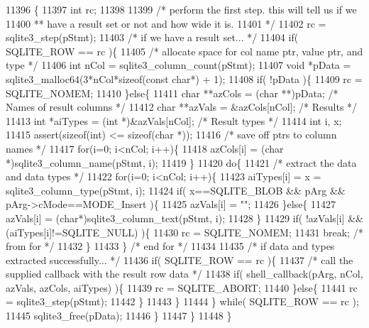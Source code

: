 \begin{DoxyCode}
11396  \{
11397   \textcolor{keywordtype}{int} rc;
11398 
11399   \textcolor{comment}{/* perform the first step.  this will tell us if we}
11400 \textcolor{comment}{  ** have a result set or not and how wide it is.}
11401 \textcolor{comment}{  */}
11402   rc = sqlite3_step(pStmt);
11403   \textcolor{comment}{/* if we have a result set... */}
11404   \textcolor{keywordflow}{if}( SQLITE_ROW == rc )\{
11405     \textcolor{comment}{/* allocate space for col name ptr, value ptr, and type */}
11406     \textcolor{keywordtype}{int} nCol = sqlite3_column_count(pStmt);
11407     \textcolor{keywordtype}{void} *pData = sqlite3_malloc64(3*nCol*\textcolor{keyword}{sizeof}(\textcolor{keyword}{const} \textcolor{keywordtype}{char}*) + 1);
11408     \textcolor{keywordflow}{if}( !pData )\{
11409       rc = SQLITE_NOMEM;
11410     \}\textcolor{keywordflow}{else}\{
11411       \textcolor{keywordtype}{char} **azCols = (\textcolor{keywordtype}{char} **)pData;      \textcolor{comment}{/* Names of result columns */}
11412       \textcolor{keywordtype}{char} **azVals = &azCols[nCol];       \textcolor{comment}{/* Results */}
11413       \textcolor{keywordtype}{int} *aiTypes = (\textcolor{keywordtype}{int} *)&azVals[nCol]; \textcolor{comment}{/* Result types */}
11414       \textcolor{keywordtype}{int} i, x;
11415       assert(\textcolor{keyword}{sizeof}(\textcolor{keywordtype}{int}) <= \textcolor{keyword}{sizeof}(\textcolor{keywordtype}{char} *));
11416       \textcolor{comment}{/* save off ptrs to column names */}
11417       \textcolor{keywordflow}{for}(i=0; i<nCol; i++)\{
11418         azCols[i] = (\textcolor{keywordtype}{char} *)sqlite3_column_name(pStmt, i);
11419       \}
11420       \textcolor{keywordflow}{do}\{
11421         \textcolor{comment}{/* extract the data and data types */}
11422         \textcolor{keywordflow}{for}(i=0; i<nCol; i++)\{
11423           aiTypes[i] = x = sqlite3_column_type(pStmt, i);
11424           \textcolor{keywordflow}{if}( x==SQLITE_BLOB && pArg && pArg->cMode==MODE_Insert )\{
11425             azVals[i] = \textcolor{stringliteral}{""};
11426           \}\textcolor{keywordflow}{else}\{
11427             azVals[i] = (\textcolor{keywordtype}{char}*)sqlite3_column_text(pStmt, i);
11428           \}
11429           \textcolor{keywordflow}{if}( !azVals[i] && (aiTypes[i]!=SQLITE_NULL) )\{
11430             rc = SQLITE_NOMEM;
11431             \textcolor{keywordflow}{break}; \textcolor{comment}{/* from for */}
11432           \}
11433         \} \textcolor{comment}{/* end for */}
11434 
11435         \textcolor{comment}{/* if data and types extracted successfully... */}
11436         \textcolor{keywordflow}{if}( SQLITE_ROW == rc )\{
11437           \textcolor{comment}{/* call the supplied callback with the result row data */}
11438           \textcolor{keywordflow}{if}( shell_callback(pArg, nCol, azVals, azCols, aiTypes) )\{
11439             rc = SQLITE_ABORT;
11440           \}\textcolor{keywordflow}{else}\{
11441             rc = sqlite3_step(pStmt);
11442           \}
11443         \}
11444       \} \textcolor{keywordflow}{while}( SQLITE_ROW == rc );
11445       sqlite3_free(pData);
11446     \}
11447   \}
11448 \}
\end{DoxyCode}
